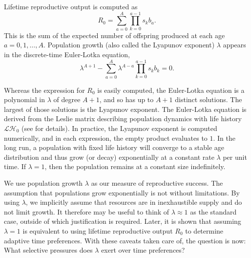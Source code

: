 \documentclass[titlepage, hidelinks, 12pt]{article}
\theoremstyle{plain}
\theoremstyle{remark}
\theoremstyle{definition}
\newcommand{\LH}{\mathcal{LH}}
\begin{document}
Lifetime reproductive output is computed as
\begin{equation}
    R_0 = \sum\limits_{a = 0}^A \prod\limits_{k = 0}^{a-1} s_k b_a.
    \label{eqn:output}
\end{equation}
This is the sum of the expected number of offspring produced at each age $a= 0, 1, \ldots, A$. 
Population growth (also called the Lyapunov exponent) $\lambda$
appears in the discrete-time Euler-Lotka equation,
\begin{equation}
    \lambda^{A+1} - \sum\limits_{a = 0}^A \lambda^{A-a} \prod\limits_{k = 0}^{a-1}s_k b_k= 0.
    \label{eqn:euler-lotka}
\end{equation}


Whereas the expression for $R_0$ is easily computed, the Euler-Lotka equation
is a polynomial in $\lambda$ of degree $A+1$, and so has up to $A+1$ distinct solutions. The largest of those solutions is the Lyapunov exponent.
The Euler-Lotka equation is derived from the Leslie matrix describing population dynamics with life history $\LH_0$ (see \cite{stearns92}
for details). In practice, the Lyapunov exponent is computed numerically, and in each expression, the empty product evaluates to $1$. 
In the long run, a population with fixed life history will converge to a stable age distribution and
thus grow (or decay) 
exponentially at a constant rate $\lambda$ per unit time. If $\lambda = 1$, then the population remains at a constant size indefinitely.

We use population growth $\lambda$ as our measure of reproductive success. The assumption that populations grow exponentially is not without limitations.
By using $\lambda$, we implicitly assume that resources are in inexhaustible supply 
and do not limit growth. It therefore
may be useful to think of $\lambda \approx 1$ as the standard case, outside of which justification is required. Later, it is shown that assuming
$\lambda = 1$ is equivalent to using lifetime reproductive output $R_0$ to determine adaptive time preferences.
With these caveats taken care of, the question is now: What selective pressures does $\lambda$ 
exert over time preferences?
\end{document}
